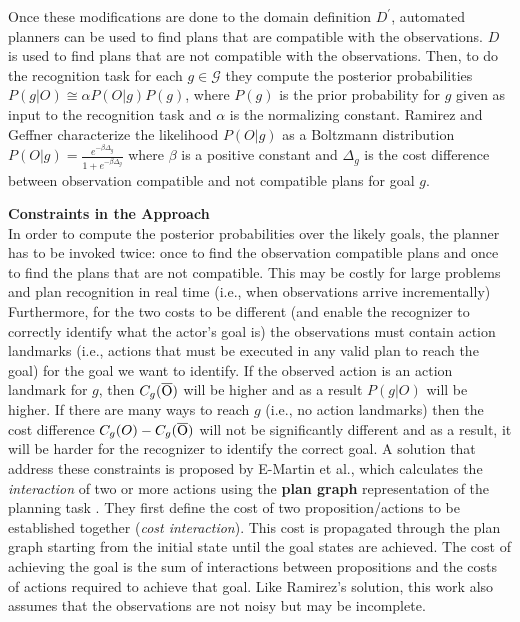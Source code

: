 Once these modifications are done to the domain definition $D^\prime$, automated planners can be used to find plans that are compatible with the observations. $D$ is used to find plans that are not compatible with the observations. Then, to do the recognition task for each $g\in \mathcal{G}$ they compute the posterior probabilities $P(g|O) \cong \alpha P(O|g) P(g) $, where $P(g)$ is the prior probability for $g$ given as input to the recognition task and $\alpha$ is the normalizing constant. Ramirez and Geffner characterize the likelihood $P(O|g)$ as a Boltzmann distribution $P(O|g)=\frac{e^{-\beta\Delta_g}}{1+e^{-\beta\Delta_g}}$ where $\beta$ is a positive constant and $\Delta_g$ is the cost difference between observation compatible and not compatible plans for goal $g$.

\noindent\textbf{Constraints in the Approach}\\
In order to compute the posterior probabilities over the likely goals, the planner has to be invoked twice: once to find the observation compatible plans and once to find the plans that are not compatible. This may be costly for large problems and plan recognition in real time (i.e., when observations arrive incrementally) Furthermore, for the two costs to be different (and enable the recognizer to correctly identify what the actor's goal is) the observations must contain action landmarks (i.e., actions that must be executed in any valid plan to reach the goal)  for the goal we want to identify. If the observed action is an action landmark for $g$, then $C_g{(\overline{\rm O})}$ will be higher and as a result $P(g|O)$ will be higher. If there are many ways to reach $g$ (i.e., no action landmarks) then the cost difference $C_g(O) - C_g{(\overline{\rm O})}$ will not be significantly different and as a result, it will be harder for the recognizer to identify the correct goal. A solution that address these constraints is proposed by E-Martin et al., which calculates the \textit{interaction} of two or more actions \cite{yolanda2015} using the \textbf{plan graph} representation of the planning task  \cite{blum1997fast}. They first define the cost of two proposition/actions to be established together (\textit{cost interaction}). This cost is propagated through the plan graph starting from the initial state until the goal states are achieved. The cost of achieving the goal is the sum of interactions between propositions and the costs of actions required to achieve that goal.
Like Ramirez's solution, this work also assumes that the observations are not noisy but may be incomplete.

